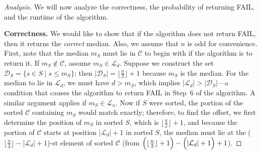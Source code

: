 \documentclass[12pt,a4paper]{article}
\newenvironment{analysis}[1][Analysis]%
{\begin{proof}[#1]}%
	{\end{proof}}
\begin{document}
	\begin{analysis}
		We will now analyze the correctness, the probability of returning \textsc{FAIL}, and the runtime of the algorithm.
		
		\textbf{Correctness.} We would like to show that if the algorithm does not return \textsc{FAIL}, then it returns the \emph{correct} median. Also, we assume that \(n\) is odd for convenience. First, note that the median \(m_S\) must lie in \(\mathcal{C}\) to begin with if the algorithm is to return it. If \(m_S \notin \mathcal{C}\), assume \(m_S \in \mathcal{L}_d\). Suppose we construct the set \(\mathcal{D}_S = \{s \in S \mid s \le m_S\}\); then \(|\mathcal{D}_S| = \lfloor \tfrac{n}{2}\rfloor + 1\) because \(m_S\) is the median. For the median to lie in \(\mathcal{L}_d\), we must have \(d > m_S\), which implies \(|\mathcal{L}_d| > |\mathcal{D}_S|\)—a condition that causes the algorithm to return \textsc{FAIL} in Step~6 of the algorithm. A similar argument applies if \(m_S \in \mathcal{L}_u\). Now if \(S\) were sorted, the portion of the sorted \(\mathcal{C}\) containing \(m_S\) would match exactly; therefore, to find the offset, we first determine the position of \(m_S\) in sorted \(S\), which is \(\lfloor \tfrac{n}{2}\rfloor + 1\), and because the portion of \(\mathcal{C}\) starts at position \(|\mathcal{L}_d| + 1\) in sorted \(S\), the median must lie at the (\(\lfloor \tfrac{n}{2}\rfloor - |\mathcal{L}_d| + 1\))-st element of sorted \(\mathcal{C}\) (from \(\Bigl(\lfloor\tfrac{n}{2}\rfloor + 1\Bigr)-\Bigl(|\mathcal{L}_d| + 1\Bigr)+1\)).
		

\end{analysis}
\end{document}
